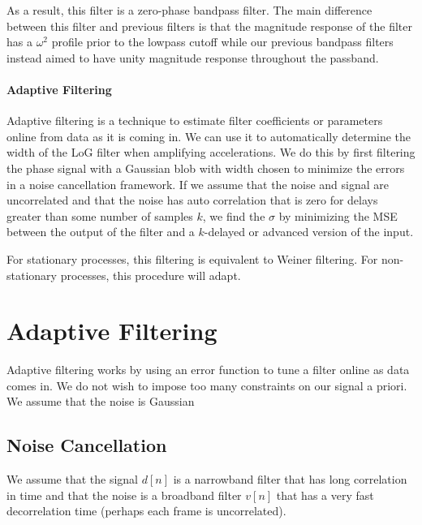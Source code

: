 \documentclass[letterpaper, 10pt]{article}
\numberwithin{equation}{section}
\begin{document}
As a result, this filter is a zero-phase bandpass filter. The main difference between this filter and previous filters is that the magnitude response of the filter has a $\omega^2$ profile prior to the lowpass cutoff while our previous bandpass filters instead aimed to have unity magnitude response throughout the passband. 


\paragraph{Adaptive Filtering} Adaptive filtering is a technique to estimate filter coefficients or parameters online from data as it is coming in. We can use it to automatically determine the width of the LoG filter when amplifying accelerations. We do this by first filtering the phase signal with a Gaussian blob with width chosen to minimize the errors in a noise cancellation framework. If we assume that the noise and signal are uncorrelated and that the noise has auto correlation that is zero for delays greater than some number of samples $k$, we find the $\sigma$ by minimizing the MSE between the output of the filter and a $k$-delayed or advanced version of the input. 

For stationary processes, this filtering is equivalent to Weiner filtering. For non-stationary processes, this procedure will adapt. 



\section{Adaptive Filtering}
Adaptive filtering works by using an error function to tune a filter online as data comes in. We do not wish to impose too many constraints on our signal a priori. We assume that the noise is Gaussian 

\subsection{Noise Cancellation}
We assume that the signal $d[n]$ is a narrowband filter that has long correlation in time and that the noise is a broadband filter $v[n]$ that has a very fast decorrelation time (perhaps each frame is uncorrelated). 
\end{document}
